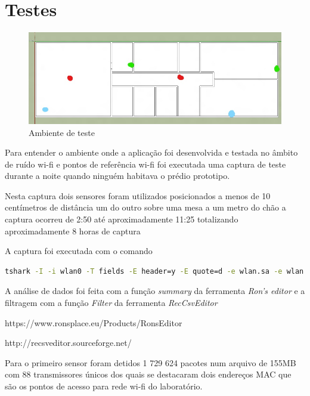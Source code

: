 \chapter{Testes}
\label{chap:Plataformas}


\begin{figure}[htb]
	\caption{\label{fig:modulos-esp}Ambiente de teste}
	\begin{center}
		\includegraphics[width=1\textwidth]{060-testes/data-analisis/planta-baixa_Ink_LI.jpg}
	\end{center}
\end{figure}


Para entender  o ambiente onde a aplicação foi desenvolvida e testada no âmbito
de ruído wi-fi e pontos de referência wi-fi foi executada uma captura de teste
durante a noite quando ninguém habitava o prédio prototipo.

Nesta captura dois sensores foram utilizados posicionados a menos de 10 centímetros
de distância um do outro sobre uma mesa a um metro do chão a captura ocorreu de 2:50
até aproximadamente 11:25 totalizando aproximadamente 8 horas de captura

A captura foi executada com o comando


\begin{lstlisting}[language=bash]
tshark -I -i wlan0 -T fields -E header=y -E quote=d -e wlan.sa -e wlan.sa_resolved -e wlan.ta -e wlan.ta_resolved -e radiotap.dbm_antsignal -e wlan_mgt.ssid >> 2017-01-17--02-48--rpi-02.csv &
\end{lstlisting}

A análise de dados foi feita com a função \emph{summary} da ferramenta \emph{Ron’s editor}
e a filtragem com a função \emph{Filter} da ferramenta \emph{RecCsvEditor}

https://www.ronsplace.eu/Products/RonsEditor

http://recsveditor.sourceforge.net/

Para o primeiro sensor foram detidos 1 729 624 pacotes num arquivo de 155MB
com 88 transmissores únicos dos quais se destacaram dois endereços MAC que são os
pontos de acesso para rede wi-fi do laboratório.



